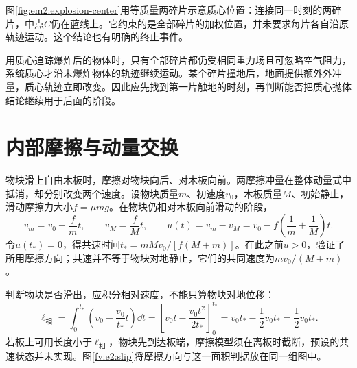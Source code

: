图\ref{fig:em2:explosion-center}用等质量两碎片示意质心位置：连接同一时刻的两碎片，中点$C$仍在蓝线上。它约束的是全部碎片的加权位置，并未要求每片各自沿原轨迹运动。这个结论也有明确的终止事件。


用质心追踪爆炸后的物体时，只有全部碎片都仍受相同重力场且可忽略空气阻力，系统质心才沿未爆炸物体的轨迹继续运动。某个碎片撞地后，地面提供额外外冲量，质心轨迹立即改变。因此应先找到第一片触地的时刻，再判断能否把质心抛体结论继续用于后面的阶段。

\section{内部摩擦与动量交换}
物块滑上自由木板时，摩擦对物块向后、对木板向前。两摩擦冲量在整体动量式中抵消，却分别改变两个速度。设物块质量$m$、初速度$v_0$，木板质量$M$、初始静止，滑动摩擦力大小$f=\mu mg$。在物块仍相对木板向前滑动的阶段，
\[
v_m=v_0-\frac fm t,\qquad v_M=\frac fM t,
\qquad u(t)=v_m-v_M=v_0-f\left(\frac1m+\frac1M\right)t.
\]
令$u(t_*)=0$，得共速时间$t_*=mMv_0/[f(M+m)]$。在此之前$u>0$，验证了所用摩擦方向；共速并不等于物块对地静止，它们的共同速度为$mv_0/(M+m)$。

判断物块是否滑出，应积分相对速度，不能只算物块对地位移：
\[
\ell_{\text{相}}=\int_0^{t_*}\left(v_0-\frac{v_0}{t_*}t\right)\dd t
=\left[v_0t-\frac{v_0t^2}{2t_*}\right]_0^{t_*}
=v_0t_*-\frac12v_0t_*=\frac12v_0t_*.
\]
若板上可用长度小于$\ell_{\text{相}}$，物块先到达板端，摩擦模型须在离板时截断，预设的共速状态并未实现。图\ref{fv:e2:slip}将摩擦方向与这一面积判据放在同一组图中。

